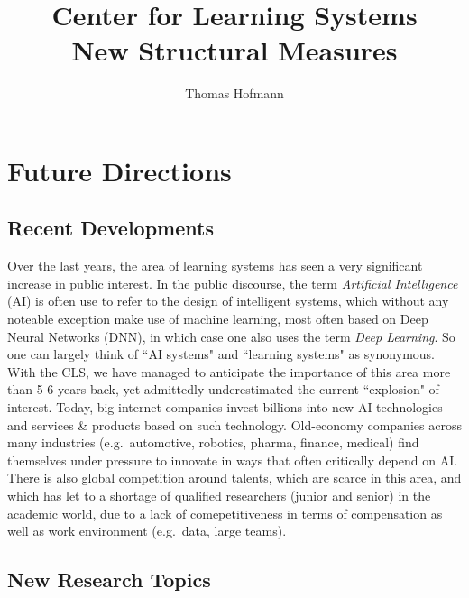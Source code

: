 \documentclass{article}
\author{Thomas Hofmann}
\title{Center for Learning Systems \\ New Structural Measures}
\begin{document}
\maketitle 

\section{Future Directions}

\label{sec:future_directions}
\subsection{Recent Developments}

Over the last years, the area of learning systems has seen a very significant increase in public interest. In the public discourse, the term \textit{Artificial Intelligence} (AI) is often use to refer to the design of intelligent systems, which without any noteable exception make use of machine learning, most often based on Deep Neural Networks (DNN), in which case one also uses the term \textit{Deep Learning}. So one can largely think of ``AI systems" and ``learning systems" as synonymous. With the CLS, we have managed to anticipate the importance of this area more than 5-6 years back, yet admittedly underestimated the current ``explosion" of interest. Today, big internet companies invest billions into new AI technologies and services \& products based on such technology. Old-economy companies across many industries (e.g.~automotive, robotics, pharma, finance, medical) find themselves under pressure to innovate in ways that often critically depend on AI. There is also global competition around talents, which are scarce in this area, and which has let to a shortage of qualified researchers (junior and senior) in the academic world, due to a lack of comepetitiveness in terms of compensation as well as work environment (e.g.~data, large teams). 

\subsection{New Research Topics}
\end{document}

